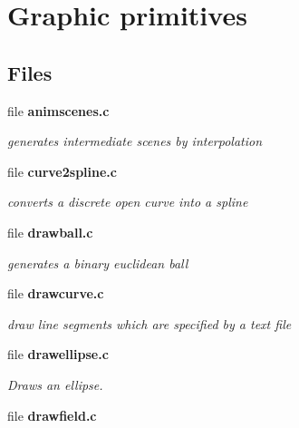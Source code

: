 \section{Graphic primitives}
\label{group__draw}
\subsection*{Files}
\begin{DoxyCompactItemize}
\item 
file {\bf animscenes.c}


\begin{DoxyCompactList}\small\item\em generates intermediate scenes by interpolation \item\end{DoxyCompactList}

\item 
file {\bf curve2spline.c}


\begin{DoxyCompactList}\small\item\em converts a discrete open curve into a spline \item\end{DoxyCompactList}

\item 
file {\bf drawball.c}


\begin{DoxyCompactList}\small\item\em generates a binary euclidean ball \item\end{DoxyCompactList}

\item 
file {\bf drawcurve.c}


\begin{DoxyCompactList}\small\item\em draw line segments which are specified by a text file \item\end{DoxyCompactList}

\item 
file {\bf drawellipse.c}


\begin{DoxyCompactList}\small\item\em Draws an ellipse. \item\end{DoxyCompactList}

\item 
file {\bf drawfield.c}



\end{DoxyCompactItemize}
